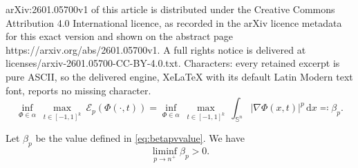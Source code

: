 \documentclass[10pt,a4paper]{amsart}
\def\S{{\mathbb S}}
\newcommand{\dif}{\,\mathrm{d}}
\newcommand{\dx}{\dif x}
\begin{document}
arXiv:2601.05700v1 of this article is distributed under the Creative Commons Attribution 4.0 International licence, as recorded in the arXiv licence metadata for this exact version and shown on the abstract page https://arxiv.org/abs/2601.05700v1. A full rights notice is delivered at licenses/arxiv-2601.05700-CC-BY-4.0.txt. Characters: every retained excerpt is pure ASCII, so the delivered engine, XeLaTeX with its default Latin Modern text font, reports no missing character.
\begin{equation}\label{eq:betapvvalue}
 \inf_{\Phi \in \alpha}\ \max_{t \in [-1,1]^k}\ \mathcal{E}_p(\Phi(\cdot,t))=\inf_{\Phi \in \alpha}\ \max_{t \in [-1,1]^k}\ \int_{\S^n} |\nabla \Phi(x,t)|^p  \dx\eqqcolon \beta_p.
\end{equation}

\begin{lemma}\label{la:minimalbeta}
Let $\beta_p$ be the value defined in \eqref{eq:betapvvalue}. We have
\[\liminf_{p \to n^+} \beta_p > 0. \]
\end{lemma}
\end{document}
